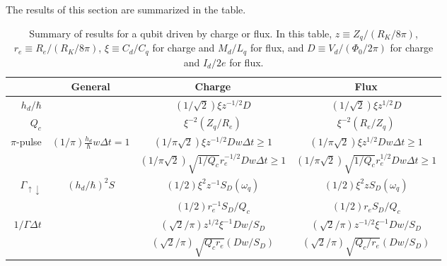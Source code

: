 
The results of this section are summarized in the table.
\begin{table*}
  \centering
  \begin{tabular}{|r|c|c|c|}
    \hline
    & General & Charge & Flux \\
    \hline \hline
    $h_d/\hbar$
      &
      & $(1/\sqrt{2}) \xi z^{-1/2} D$
      & $(1/\sqrt{2}) \xi z^{1/2} D$
      \\
    \hline
    $Q_c$
      &
      & $\xi^{-2} (Z_q/R_e)$
      & $\xi^{-2} (R_e/Z_q)$
      \\
    \hline
    $\pi$-pulse
      & $(1/\pi) \frac{h_d}{\hbar} w \Delta t = 1$
      & $(1/\pi\sqrt{2}) \xi z^{-1/2} D w \Delta t \geq 1$
      & $(1/\pi\sqrt{2}) \xi z^{1/2}  D w \Delta t \geq 1$
      \\
      &
      & $(1/\pi\sqrt{2}) \sqrt{1/Q_c} r_e^{-1/2} D w \Delta t \geq 1$
      & $(1/\pi\sqrt{2}) \sqrt{1/Q_c} r_e^{1/2}  D w \Delta t \geq 1$
      \\
    \hline
    $\Gamma_{\uparrow\downarrow}$
      & $(h_d/\hbar)^2 S$
      & $(1/2) \xi^2 z^{-1} S_D(\omega_q)$
      & $(1/2) \xi^2 z      S_D(\omega_q)$
      \\
      &
      & $(1/2) r_e^{-1} S_D / Q_c$
      & $(1/2) r_e      S_D / Q_c$
      \\
    \hline
    $1/\Gamma \Delta t$
      &
      & $(\sqrt{2}/\pi) z^{1/2}  \xi^{-1} Dw/S_D$
      & $(\sqrt{2}/\pi) z^{-1/2} \xi^{-1} Dw/S_D$
      \\
      &
      & $(\sqrt{2}/\pi) \sqrt{Q_c r_e} (Dw/S_D)$
      & $(\sqrt{2}/\pi) \sqrt{Q_c/r_e} (Dw/S_D)$
      \\
    \hline
  \end{tabular}
  \caption{Summary of results for a qubit driven by charge or flux. In this table, $z\equiv Z_q/(R_K/8\pi)$, $r_e \equiv R_e / (R_K/8\pi)$, $\xi \equiv C_d/C_q$ for charge and $M_d/L_q$ for flux, and $D \equiv V_d/(\Phi_0 / 2\pi)$ for charge and $I_d/2e$ for flux.}
\end{table*}
